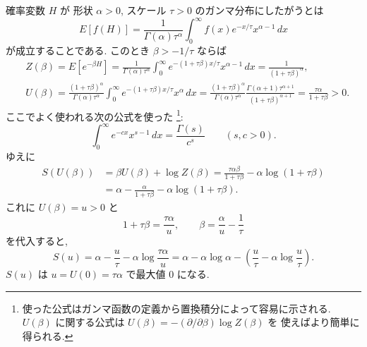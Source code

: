 \documentclass[12pt,twoside]{jarticle}
\renewcommand\d{\partial}
\theoremstyle{jplain}
\theoremstyle{jplain}
\theoremstyle{jplain}
\numberwithin{theorem}{section}
\numberwithin{equation}{section}
\numberwithin{figure}{section}
\numberwithin{table}{section}
\begin{document}
確率変数 $H$ が
形状 $\alpha>0$, スケール $\tau>0$ のガンマ分布にしたがうとは
\[
E[f(H)]=
\frac{1}{\Gamma(\alpha)\tau^\alpha}
\int_0^\infty f(x)e^{-x/\tau}x^{\alpha-1}\,dx
\]
が成立することである. このとき $\beta>-1/\tau$ ならば
\begin{align*}
&
Z(\beta)=E[e^{-\beta H}]
=\frac{1}{\Gamma(\alpha)\tau^\alpha}
\int_0^\infty e^{-(1+\tau\beta)x/\tau}x^{\alpha-1}\,dx
=\frac{1}{(1+\tau\beta)^\alpha},
\\ &
U(\beta)
=
\frac{(1+\tau\beta)^\alpha}{\Gamma(\alpha)\tau^\alpha}
\int_0^\infty e^{-(1+\tau\beta)x/\tau}x^\alpha \,dx
=
\frac{(1+\tau\beta)^\alpha}{\Gamma(\alpha)\tau^\alpha}
\frac{\Gamma(\alpha+1)\tau^{\alpha+1}}{(1+\tau\beta)^{\alpha+1}}
=
\frac{\tau\alpha}{1+\tau\beta}>0.
\end{align*}
ここでよく使われる次の公式を使った%
\footnote{使った公式はガンマ函数の定義から置換積分によって容易に示される.
$U(\beta)$ に関する公式は $U(\beta)=-(\d/\d\beta)\log Z(\beta)$ を
使えばより簡単に得られる.}:
\[
\int_0^\infty e^{-c x}x^{s-1}\,dx = \frac{\Gamma(s)}{c^s}
\qquad (s,c>0).
\]
ゆえに
\begin{align*}
S(U(\beta))
&
=\beta U(\beta)+\log Z(\beta)
=\frac{\tau\alpha\beta}{1+\tau\beta}
-\alpha\log(1+\tau\beta)
\\ &
=\alpha - \frac{\alpha}{1+\tau\beta}-\alpha\log(1+\tau\beta).
\end{align*}
これに $U(\beta)=u>0$ と
\[
1+\tau\beta = \frac{\tau\alpha}{u}, \qquad
\beta=\frac{\alpha}{u}-\frac{1}{\tau}
\]
を代入すると,
\[
S(u)
= \alpha-\frac{u}{\tau}-\alpha\log\frac{\tau\alpha}{u}
= \alpha-\alpha\log\alpha -\left(\frac{u}{\tau}-\alpha\log\frac{u}{\tau}\right).
\]
$S(u)$ は $u=U(0)=\tau\alpha$ で最大値 $0$ になる.
\end{document}
